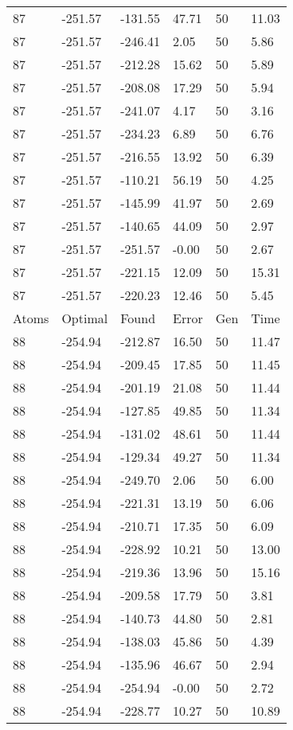 \documentclass{report}
\begin{document}
\begin{appendix}
\begin{longtable}{llllll}
87 & -251.57 & -131.55 & 47.71 & 50 & 11.03 \\
87 & -251.57 & -246.41 & 2.05 & 50 & 5.86 \\
87 & -251.57 & -212.28 & 15.62 & 50 & 5.89 \\
87 & -251.57 & -208.08 & 17.29 & 50 & 5.94 \\
87 & -251.57 & -241.07 & 4.17 & 50 & 3.16 \\
87 & -251.57 & -234.23 & 6.89 & 50 & 6.76 \\
87 & -251.57 & -216.55 & 13.92 & 50 & 6.39 \\
87 & -251.57 & -110.21 & 56.19 & 50 & 4.25 \\
87 & -251.57 & -145.99 & 41.97 & 50 & 2.69 \\
87 & -251.57 & -140.65 & 44.09 & 50 & 2.97 \\
87 & -251.57 & -251.57 & -0.00 & 50 & 2.67 \\
87 & -251.57 & -221.15 & 12.09 & 50 & 15.31 \\
87 & -251.57 & -220.23 & 12.46 & 50 & 5.45 \\
Atoms & Optimal & Found & Error & Gen & Time \\
88 & -254.94 & -212.87 & 16.50 & 50 & 11.47 \\
88 & -254.94 & -209.45 & 17.85 & 50 & 11.45 \\
88 & -254.94 & -201.19 & 21.08 & 50 & 11.44 \\
88 & -254.94 & -127.85 & 49.85 & 50 & 11.34 \\
88 & -254.94 & -131.02 & 48.61 & 50 & 11.44 \\
88 & -254.94 & -129.34 & 49.27 & 50 & 11.34 \\
88 & -254.94 & -249.70 & 2.06 & 50 & 6.00 \\
88 & -254.94 & -221.31 & 13.19 & 50 & 6.06 \\
88 & -254.94 & -210.71 & 17.35 & 50 & 6.09 \\
88 & -254.94 & -228.92 & 10.21 & 50 & 13.00 \\
88 & -254.94 & -219.36 & 13.96 & 50 & 15.16 \\
88 & -254.94 & -209.58 & 17.79 & 50 & 3.81 \\
88 & -254.94 & -140.73 & 44.80 & 50 & 2.81 \\
88 & -254.94 & -138.03 & 45.86 & 50 & 4.39 \\
88 & -254.94 & -135.96 & 46.67 & 50 & 2.94 \\
88 & -254.94 & -254.94 & -0.00 & 50 & 2.72 \\
88 & -254.94 & -228.77 & 10.27 & 50 & 10.89 \\

\end{longtable}
\end{appendix}
\end{document}
